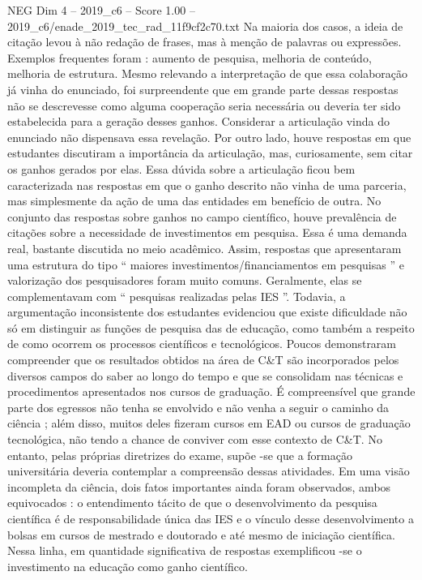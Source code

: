 \begin{textsample}{NEG Dim 4 – 2019\_c6 – Score 1.00 – 2019\_c6/enade\_2019\_tec\_rad\_11f9cf2c70.txt}
Na maioria dos casos, a ideia de citação levou à não redação de frases, mas à menção de palavras ou expressões.
Exemplos frequentes foram : aumento de pesquisa, melhoria de conteúdo, melhoria de estrutura.
Mesmo relevando a interpretação de que essa colaboração já vinha do enunciado, foi surpreendente que em grande parte dessas respostas não se descrevesse como alguma cooperação seria necessária ou deveria ter sido estabelecida para a geração desses ganhos.
Considerar a articulação vinda do enunciado não dispensava essa revelação.
Por outro lado, houve respostas em que estudantes discutiram a importância da articulação, mas, curiosamente, sem citar os ganhos gerados por elas.
Essa dúvida sobre a articulação ficou bem caracterizada nas respostas em que o ganho descrito não vinha de uma parceria, mas simplesmente da ação de uma das entidades em benefício de outra.
No conjunto das respostas sobre ganhos no campo científico, houve prevalência de citações sobre a necessidade de investimentos em pesquisa.
Essa é uma demanda real, bastante discutida no meio acadêmico.
Assim, respostas que apresentaram uma estrutura do tipo “ maiores investimentos/financiamentos em pesquisas ” e valorização dos pesquisadores foram muito comuns.
Geralmente, elas se complementavam com “ pesquisas realizadas pelas IES ”.
Todavia, a argumentação inconsistente dos estudantes evidenciou que existe dificuldade não só em distinguir as funções de pesquisa das de educação, como também a respeito de como ocorrem os processos científicos e tecnológicos.
Poucos demonstraram compreender que os resultados obtidos na área de C\&T são incorporados pelos diversos campos do saber ao longo do tempo e que se consolidam nas técnicas e procedimentos apresentados nos cursos de graduação.
É compreensível que grande parte dos egressos não tenha se envolvido e não venha a seguir o caminho da ciência ; além disso, muitos deles fizeram cursos em EAD ou cursos de graduação tecnológica, não tendo a chance de conviver com esse contexto de C\&T.
No entanto, pelas próprias diretrizes do exame, supõe -se que a formação universitária deveria contemplar a compreensão dessas atividades.
Em uma visão incompleta da ciência, dois fatos importantes ainda foram observados, ambos equivocados : o entendimento tácito de que o desenvolvimento da pesquisa científica é de responsabilidade única das IES e o vínculo desse desenvolvimento a bolsas em cursos de mestrado e doutorado e até mesmo de iniciação científica.
Nessa linha, em quantidade significativa de respostas exemplificou -se o investimento na educação como ganho científico.

\end{textsample}
